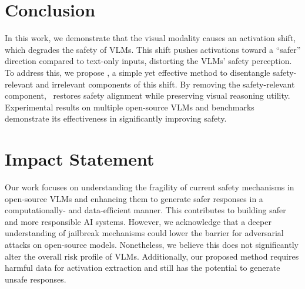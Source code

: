 \vspace{-5pt}
\section{Conclusion}

In this work, we demonstrate that the visual modality causes an activation shift, which degrades the safety of VLMs. This shift pushes activations toward a “safer” direction compared to text-only inputs, distorting the VLMs’ safety perception. To address this, we propose \OursMethod, a simple yet effective method to disentangle safety-relevant and irrelevant components of this shift. By removing the safety-relevant component, \OursMethod\ restores safety alignment while preserving visual reasoning utility. Experimental results on multiple open-source VLMs and benchmarks demonstrate its effectiveness in significantly improving safety.


\section*{Impact Statement}

Our work focuses on understanding the fragility of current safety mechanisms in open-source VLMs and enhancing them to generate safer responses in a computationally- and data-efficient manner. This contributes to building safer and more responsible AI systems. However, we acknowledge that a deeper understanding of jailbreak mechanisms could lower the barrier for adversarial attacks on open-source models. Nonetheless, we believe this does not significantly alter the overall risk profile of VLMs. Additionally, our proposed method requires harmful data for activation extraction and still has the potential to generate unsafe responses.
